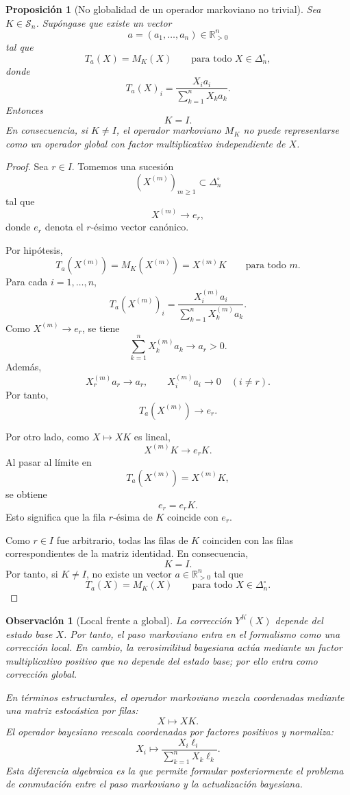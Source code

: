 \documentclass[12pt]{article}
\newtheorem{proposicion}{Proposición}[section]
\newtheorem{observacion}{Observación}[section]
\begin{document}
\begin{proposicion}[No globalidad de un operador markoviano no trivial]\label{prop:markov_no_global}
Sea \(K\in\mathcal S_n\). Supóngase que existe un vector
\[
a=(a_1,\dots,a_n)\in\mathbb R_{>0}^n
\]
tal que
\[
T_a(X)=M_K(X)
\qquad
\text{para todo }X\in\Delta_n^\circ,
\]
donde
\[
T_a(X)_i
=
\frac{X_i a_i}{\sum_{k=1}^n X_k a_k}.
\]
Entonces
\[
K=I.
\]
En consecuencia, si \(K\neq I\), el operador markoviano \(M_K\) no puede representarse como un operador global con factor multiplicativo independiente de \(X\).
\end{proposicion}

\begin{proof}
Sea \(r\in I\). Tomemos una sucesión
\[
(X^{(m)})_{m\ge1}\subset\Delta_n^\circ
\]
tal que
\[
X^{(m)}\to e_r,
\]
donde \(e_r\) denota el \(r\)-ésimo vector canónico.

Por hipótesis,
\[
T_a(X^{(m)})=M_K(X^{(m)})=X^{(m)}K
\qquad
\text{para todo }m.
\]
Para cada \(i=1,\dots,n\),
\[
T_a(X^{(m)})_i
=
\frac{X_i^{(m)}a_i}{\sum_{k=1}^nX_k^{(m)}a_k}.
\]
Como \(X^{(m)}\to e_r\), se tiene
\[
\sum_{k=1}^nX_k^{(m)}a_k\to a_r>0.
\]
Además,
\[
X_r^{(m)}a_r\to a_r,
\qquad
X_i^{(m)}a_i\to 0
\quad (i\neq r).
\]
Por tanto,
\[
T_a(X^{(m)})\to e_r.
\]

Por otro lado, como \(X\mapsto XK\) es lineal,
\[
X^{(m)}K\to e_rK.
\]
Al pasar al límite en
\[
T_a(X^{(m)})=X^{(m)}K,
\]
se obtiene
\[
e_r=e_rK.
\]
Esto significa que la fila \(r\)-ésima de \(K\) coincide con \(e_r\).

Como \(r\in I\) fue arbitrario, todas las filas de \(K\) coinciden con las filas correspondientes de la matriz identidad. En consecuencia,
\[
K=I.
\]
Por tanto, si \(K\neq I\), no existe un vector \(a\in\mathbb R_{>0}^n\) tal que
\[
T_a(X)=M_K(X)
\qquad
\text{para todo }X\in\Delta_n^\circ.
\]
\end{proof}

\begin{observacion}[Local frente a global]\label{obs:local_vs_global}
La corrección \(Y^K(X)\) depende del estado base \(X\). Por tanto, el paso markoviano entra en el formalismo como una corrección local. En cambio, la verosimilitud bayesiana actúa mediante un factor multiplicativo positivo que no depende del estado base; por ello entra como corrección global.

En términos estructurales, el operador markoviano mezcla coordenadas mediante una matriz estocástica por filas:
\[
X\longmapsto XK.
\]
El operador bayesiano reescala coordenadas por factores positivos y normaliza:
\[
X_i\longmapsto
\frac{X_i\ell_i}{\sum_{k=1}^n X_k\ell_k}.
\]
Esta diferencia algebraica es la que permite formular posteriormente el problema de conmutación entre el paso markoviano y la actualización bayesiana.
\end{observacion}
\end{document}
